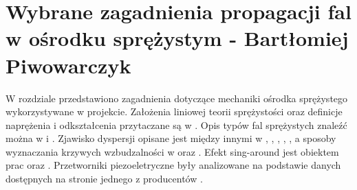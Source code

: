 \chapter{Wybrane zagadnienia propagacji fal w ośrodku sprężystym - Bartłomiej Piwowarczyk}
\label{cha:wybrane_zagadnienia_propagacji_fal_w_osrodku_sprezystym}

W rozdziale przedstawiono zagadnienia dotyczące mechaniki ośrodka sprężystego wykorzystywane w projekcie. Założenia liniowej teorii sprężystości oraz definicje naprężenia i odkształcenia przytaczane są w \cite{bartek_wolny}. Opis typów fal sprężystych znaleźć można w \cite{bartek_rose} i \cite{bartek_nazarchuk}. Zjawisko dyspersji opisane jest między innymi w \cite{bartek_rose}, \cite{bartek_feruza}, \cite{bartek_cervena}, \cite{bartek_tian}, \cite{bartek_valsamos}, a sposoby wyznaczania krzywych wzbudzalności w \cite{bartek_kijanka} oraz \cite{bartek_fabien}. Efekt sing-around jest obiektem prac \cite{bartek_kwach} oraz \cite{bartek_kwach2}. Przetworniki piezoeletryczne były analizowane na podstawie danych dostępnych na stronie jednego z producentów \cite{bartek_piezo}.





























